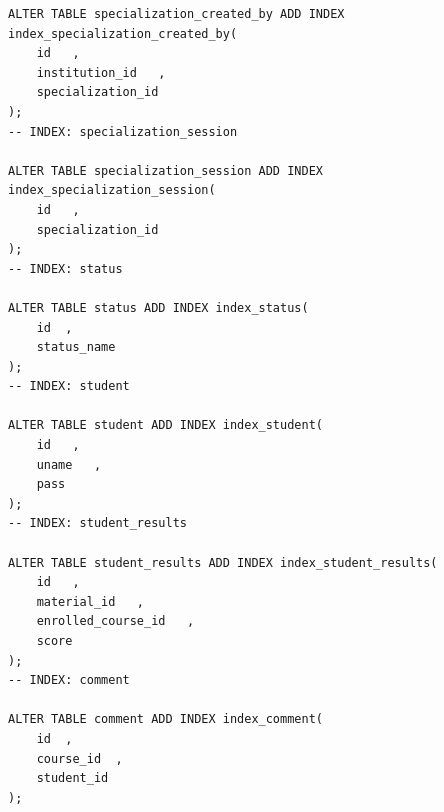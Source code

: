 \documentclass[12pt,a4paper,titlepage]{article}
\begin{document}
\begin{lstlisting}
ALTER TABLE specialization_created_by ADD INDEX index_specialization_created_by(
    id   ,
    institution_id   ,
    specialization_id   
);
-- INDEX: specialization_session

ALTER TABLE specialization_session ADD INDEX index_specialization_session(
    id   ,
    specialization_id   
);
-- INDEX: status

ALTER TABLE status ADD INDEX index_status(
    id  ,
    status_name   
);
-- INDEX: student

ALTER TABLE student ADD INDEX index_student(
    id   ,
    uname   ,
    pass   
);
-- INDEX: student_results

ALTER TABLE student_results ADD INDEX index_student_results(
    id   ,
    material_id   ,
    enrolled_course_id   ,
    score   
);
-- INDEX: comment

ALTER TABLE comment ADD INDEX index_comment(
	id  ,
	course_id  ,
	student_id  
);
\end{lstlisting}
\newpage
\end{document}
